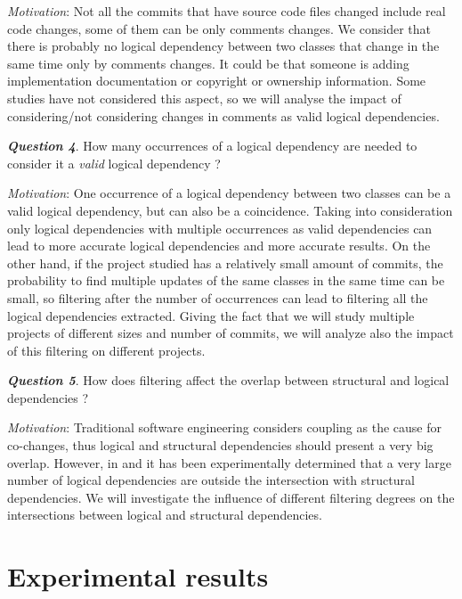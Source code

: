 \documentclass[a4paper,twoside]{article}
\begin{document}
\textit{Motivation}: Not all the commits that have source code files changed include real code changes, some of them can be only comments changes. We consider that there is probably no logical dependency between two classes that change in the same time only by comments changes. It could be that someone is adding implementation documentation or copyright or ownership information. Some studies have not considered this aspect, so we will analyse the impact of considering/not considering changes in  comments as valid logical dependencies. 


\textit{\textbf{Question 4}}. How many occurrences of a logical dependency are needed to consider it a \textit{valid} logical dependency ? 

\textit{Motivation}: One occurrence of a logical dependency between two classes can be a valid logical dependency, but can also be a coincidence. Taking into consideration only logical dependencies with multiple occurrences as valid dependencies can lead to more accurate logical dependencies and more accurate results. On the other hand, if the project studied has a relatively small amount of commits, the probability to find multiple updates of the same classes in the same time can be small, so filtering after the number of occurrences can lead to filtering all the logical dependencies extracted. Giving the fact that we will study multiple projects of different sizes and number of commits, we will analyze also the impact of this filtering on different projects.

\textit{\textbf{Question 5}}. How does filtering affect the overlap between structural and logical dependencies ? 

\textit{Motivation}: Traditional software engineering considers coupling as the cause for co-changes, thus logical and structural dependencies should present a very big overlap. However, in \cite{Oliva:2011:ISL:2067853.2068086} and \cite{DBLP:journals/jss/AjienkaC17} it has been experimentally determined that a very large number of logical dependencies are outside the intersection with structural dependencies. We will investigate the influence of different filtering degrees on the intersections between logical and structural dependencies.  



\section{Experimental results}
\label{sec:experiments}
\end{document}
